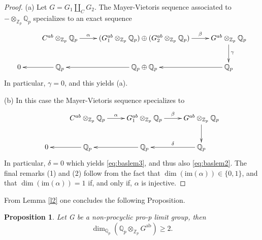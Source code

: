 \documentclass[10pt]{amsart}
\theoremstyle{plain}
\newtheorem{prop}{Proposition}
\theoremstyle{definition}
\theoremstyle{remark}
\numberwithin{prop}{section}
\numberwithin{example}{section}
\numberwithin{equation}{section}
\newcommand{\Z}{\mathbb{Z}}
\newcommand{\Q}{\mathbb{Q}}
\newcommand{\ab}{\mathrm{ab}}
\newcommand{\image}{\mathrm{im}}
\begin{document}
\begin{proof}
	(a) Let $G=G_1\amalg_{C}G_2$. 
	The Mayer-Vietoris sequence associated to 
	$-\otimes_{\Z_p}\Q_p$ specializes to an exact sequence
	\begin{equation}
	\label{eq:baslem444}
	\xymatrix{
		&C^{ab}\otimes_{\Z_p} \Q_p \ar[r]^-{\alpha}& 
		(G_1^{ab}\otimes_{\Z_p} \Q_p)\oplus (G_2^{ab}\otimes_{\Z_p} \Q_p)\ar[r]^-{\beta}&
		G^{ab}\otimes_{\Z_p} \Q_p\ar[d]^\gamma\\
		0& \Q_p\ar[l]&\Q_p\oplus \Q_p\ar[l]&\Q_p\ar[l]
	}
	\end{equation} 
	In particular, $\gamma=0$, and this yields (a).
	
	\noindent
	(b) In this case the Mayer-Vietoris sequence specializes to
	\begin{equation}
	\label{eq:baslem555}
	\xymatrix{
		&C^{ab}\otimes_{\Z_p} \Q_p\ar[r]^-{\alpha}& 
		G_1^{ab}\otimes_{\Z_p} \Q_p\ar[r]^-{\beta}&
		G^{ab}\otimes_{\Z_p} \Q_p\ar[d]\\
		0& \Q_p\ar[l]&\Q_p\ar[l]&\Q_p\ar[l]_-{\delta}
	}
	\end{equation} 
	In particular, $\delta=0$ which yields \eqref{eq:baslem3}, and thus also \eqref{eq:baslem2}. The final
	remarks (1) and (2) follow from the fact that
	$\dim(\image(\alpha))\in\{0,1\}$, and that $\dim(\image(\alpha))=1$ if, and only if, $\alpha$ is injective.
\end{proof}

From Lemma \ref{l2} one concludes the following Proposition. 

\begin{prop}\label{l12}
	Let  G be a   non-procyclic pro-p limit group, then   $$\dim_{\Q_p}(\Q_p\otimes_{\Z_p}G^{\ab})\geq  2.$$	 
\end{prop}
\end{document}
